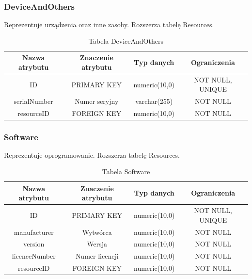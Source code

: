\subsubsection{DeviceAndOthers}
Reprezentuje urządzenia oraz inne zasoby. Rozszerza tabelę Resources.
\begin{table}[H]
	\renewcommand\arraystretch{1.5}
	\renewcommand\tabcolsep{3pt}
	\begin{tabular}{| c | c | c | c |} 
		\hline \textbf{Nazwa atrybutu} & \textbf{Znaczenie atrybutu} & \textbf{Typ danych} & \textbf{Ograniczenia} \\ 
		\hline ID & PRIMARY KEY & numeric(10,0) & NOT NULL, UNIQUE \\ 
		\hline serialNumber & Numer seryjny & varchar(255) & NOT NULL \\ 
		\hline resourceID & FOREIGN KEY & numeric(10,0) & NOT NULL \\ 
		\hline 
	\end{tabular} 
	\caption{Tabela DeviceAndOthers}
	\label{TAB:DeviceAndOthers}
\end{table}

\subsubsection{Software}
Reprezentuje oprogramowanie. Rozszerza tabelę Resources.
\begin{table}[H]
	\renewcommand\arraystretch{1.5}
	\renewcommand\tabcolsep{3pt}
	\begin{tabular}{| c | c | c | c |} 
		\hline \textbf{Nazwa atrybutu} & \textbf{Znaczenie atrybutu} & \textbf{Typ danych} & \textbf{Ograniczenia} \\ 
		\hline ID & PRIMARY KEY & numeric(10,0) & NOT NULL, UNIQUE \\ 
		\hline manufacturer & Wytwórca & numeric(10,0) & NOT NULL \\ 
		\hline version & Wersja & numeric(10,0) & NOT NULL \\ 
		\hline licenceNumber & Numer licencji & numeric(10,0) & NOT NULL \\ 
		\hline resourceID & FOREIGN KEY & numeric(10,0) & NOT NULL \\ 
		\hline 
	\end{tabular} 
	\caption{Tabela Software}
	\label{TAB:Software}
\end{table}